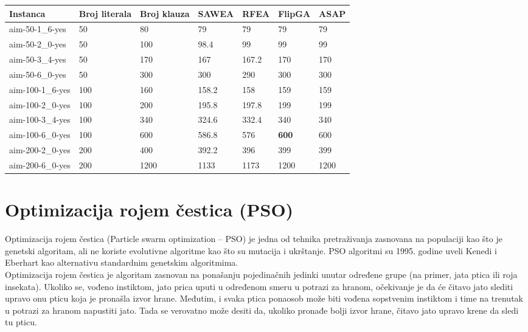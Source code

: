 \documentclass{article}
\begin{document}
\begin{table}[h!]
\centering
{}\label{tab:ea_SAT} 
\begin{tabular}{ |p{3cm}|p{1.6cm}|p{1.6cm}||p{1.6cm}|p{1.6cm}|p{1.6cm}|p{1.6cm}|} \hline
 Instanca & Broj \break literala & Broj \break klauza & SAWEA & RFEA & FlipGA & ASAP \\ \hline
 aim-50-1\_6-yes & 50 & 80 & 79 & 79 & 79 &  79 \\ \hline
 aim-50-2\_0-yes & 50 & 100 &  98.4 &  99 & 99 & 99 \\ \hline
 aim-50-3\_4-yes & 50 & 170 & 167 & 167.2 & 170 & 170  \\ \hline
 aim-50-6\_0-yes & 50 & 300 &  300 & 290 &  300 &  300 \\ \hline 
 \hline
 aim-100-1\_6-yes & 100 & 160 & 158.2 & 158 &  159 & 159 \\ \hline
 aim-100-2\_0-yes & 100 & 200 & 195.8 &  197.8 & 199 &  199 \\ \hline
 aim-100-3\_4-yes & 100 & 340 & 324.6  & 332.4 & 340 & 340 \\ \hline
 aim-100-6\_0-yes & 100 & 600 &  586.8 & 576 & \textbf{600} & 600 \\ \hline
 \hline
 aim-200-2\_0-yes & 200 & 400 &  392.2 & 396 & 399 & 399 \\ \hline
 aim-200-6\_0-yes & 200 & 1200 & 1133 & 1173 &  1200 & 1200 \\ \hline
\end{tabular} 
\end{table}




\section{Optimizacija rojem čestica (PSO)}
\label{sec:pso}
Optimizacija rojem čestica (Particle swarm optimization – PSO) je jedna od tehnika pretraživanja zasnovana na populaciji kao što je genetski algoritam, ali ne koriste evolutivne algoritme kao što su mutacija i ukrštanje.
PSO algoritmi su 1995. godine uveli Kenedi i Eberhart kao alternativu standardnim genetskim algoritmima. \\

Optimizacija rojem čestica je algoritam zasnovan na ponašanju pojedinačnih jedinki unutar određene grupe (na primer, jata ptica ili roja insekata). Ukoliko se, vođeno instiktom, jato prica uputi u određenom smeru u potrazi za hranom, očekivanje je da će čitavo jato slediti upravo onu pticu koja je pronašla izvor hrane. Međutim, i svaka ptica ponaosob može biti vođena sopstvenim instiktom i time na trenutak u potrazi za hranom napustiti jato. Tada se verovatno može desiti da, ukoliko pronađe bolji izvor hrane, čitavo jato upravo krene da sledi tu pticu. \\
\end{document}
